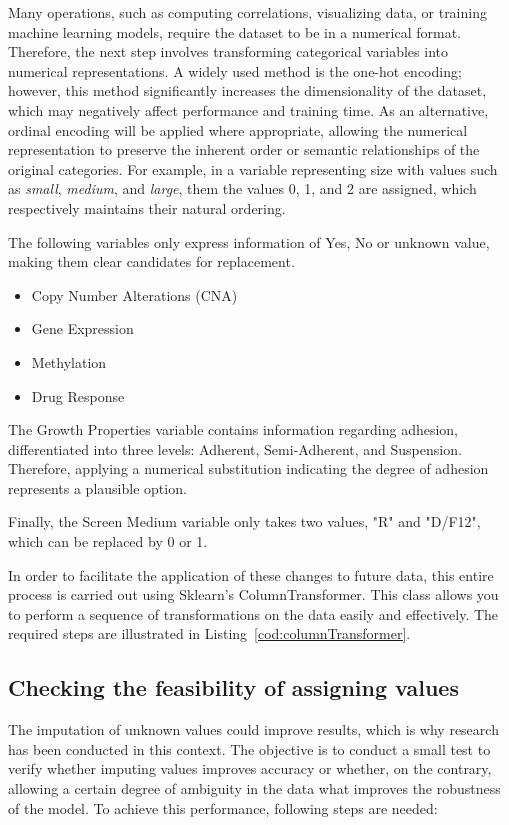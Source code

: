 Many operations, such as computing correlations, visualizing data, or training machine learning models, require the dataset to be in a numerical format. Therefore, the next step involves transforming categorical variables into numerical representations. A widely used method is the one-hot encoding; however, this method significantly increases the dimensionality of the dataset, which may negatively affect performance and training time. As an alternative, ordinal encoding will be applied where appropriate, allowing the numerical representation to preserve the inherent order or semantic relationships of the original categories. For example, in a variable representing size with values such as \textit{small}, \textit{medium}, and \textit{large}, them the values 0, 1, and 2 are assigned, which respectively maintains their natural ordering.

The following variables only express information of Yes, No or unknown value, making them clear candidates for replacement.
\begin{itemize}
    \item Copy Number Alterations (CNA)
    \item Gene Expression
    \item Methylation
    \item Drug Response
\end{itemize}

The Growth Properties variable contains information regarding adhesion, differentiated into three levels: Adherent, Semi-Adherent, and Suspension. Therefore, applying a numerical substitution indicating the degree of adhesion represents a plausible option.

Finally, the Screen Medium variable only takes two values, "R" and "D/F12", which can be replaced by 0 or 1.

In order to facilitate the application of these changes to future data, this entire process is carried out using Sklearn's ColumnTransformer. This class allows you to perform a sequence of transformations on the data easily and effectively. The required steps are illustrated in Listing~\ref{cod:columnTransformer}.

\subsection{Checking the feasibility of assigning values}

The imputation of unknown values could improve results, which is why research has been conducted in this context. The objective is to conduct a small test to verify whether imputing values improves accuracy or whether, on the contrary, allowing a certain degree of ambiguity in the data what improves the robustness of the model. To achieve this performance, following steps are needed:

